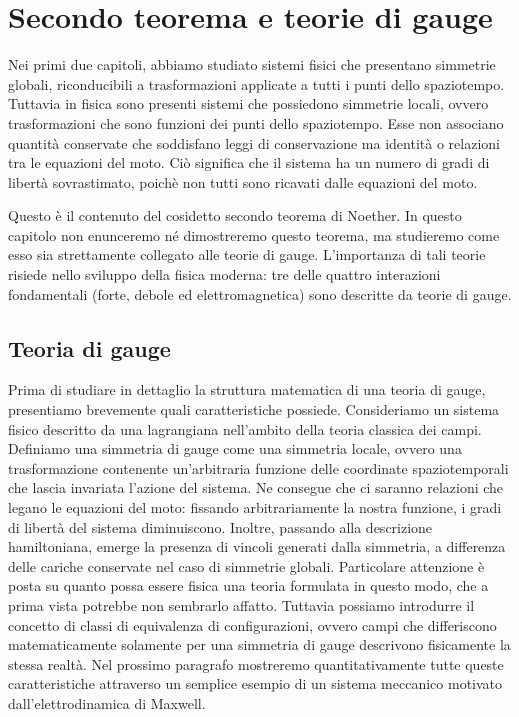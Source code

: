 \chapter{Secondo teorema e teorie di gauge}

    Nei primi due capitoli, abbiamo studiato sistemi fisici che presentano simmetrie globali, riconducibili a trasformazioni applicate a tutti i punti dello spaziotempo. Tuttavia in fisica sono presenti sistemi che possiedono simmetrie locali, ovvero trasformazioni che sono funzioni dei punti dello spaziotempo. Esse non associano quantità conservate che soddisfano leggi di conservazione ma identità o relazioni tra le equazioni del moto. Ciò significa che il sistema ha un numero di gradi di libertà sovrastimato, poichè non tutti sono ricavati dalle equazioni del moto.

    Questo è il contenuto del cosidetto secondo teorema di Noether. In questo capitolo non enunceremo né dimostreremo questo teorema, ma studieremo come esso sia strettamente collegato alle teorie di gauge. L'importanza di tali teorie risiede nello sviluppo della fisica moderna: tre delle quattro interazioni fondamentali (forte, debole ed elettromagnetica) sono descritte da teorie di gauge.

\section{Teoria di gauge}
    Prima di studiare in dettaglio la struttura matematica di una teoria di gauge, presentiamo brevemente quali caratteristiche possiede. Consideriamo un sistema fisico descritto da una lagrangiana nell'ambito della teoria classica dei campi. Definiamo una simmetria di gauge come una simmetria locale, ovvero una trasformazione contenente un'arbitraria funzione delle coordinate spaziotemporali che lascia invariata l'azione del sistema. Ne consegue che ci saranno relazioni che legano le equazioni del moto: fissando arbitrariamente la nostra funzione, i gradi di libertà del sistema diminuiscono. Inoltre, passando alla descrizione hamiltoniana, emerge la presenza di vincoli generati dalla simmetria, a differenza delle cariche conservate nel caso di simmetrie globali. Particolare attenzione è posta su quanto possa essere fisica una teoria formulata in questo modo, che a prima vista potrebbe non sembrarlo affatto. Tuttavia possiamo introdurre il concetto di classi di equivalenza di configurazioni, ovvero campi che differiscono matematicamente solamente per una simmetria di gauge descrivono fisicamente la stessa realtà. Nel prossimo paragrafo mostreremo quantitativamente tutte queste caratteristiche attraverso un semplice esempio di un sistema meccanico motivato dall'elettrodinamica di Maxwell.
    
